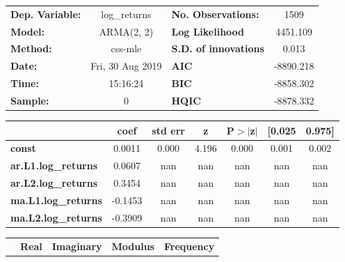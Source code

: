 \begin{center}
\begin{tabular}{lclc}
\toprule
\textbf{Dep. Variable:}     &        log\_returns       & \textbf{  No. Observations:  } &            1509            \\
\textbf{Model:}             &         ARMA(2, 2)        & \textbf{  Log Likelihood     } &          4451.109          \\
\textbf{Method:}            &          css-mle          & \textbf{  S.D. of innovations} &           0.013            \\
\textbf{Date:}              &      Fri, 30 Aug 2019     & \textbf{  AIC                } &         -8890.218          \\
\textbf{Time:}              &          15:16:24         & \textbf{  BIC                } &         -8858.302          \\
\textbf{Sample:}            &             0             & \textbf{  HQIC               } &         -8878.332          \\
\bottomrule
\end{tabular}
\begin{tabular}{lcccccc}
                            & \textbf{coef} & \textbf{std err} & \textbf{z} & \textbf{P$> |$z$|$} & \textbf{[0.025} & \textbf{0.975]}  \\
\midrule
\textbf{const}              &       0.0011  &        0.000     &     4.196  &         0.000        &        0.001    &        0.002     \\
\textbf{ar.L1.log\_returns} &       0.0607  &          nan     &       nan  &           nan        &          nan    &          nan     \\
\textbf{ar.L2.log\_returns} &       0.3454  &          nan     &       nan  &           nan        &          nan    &          nan     \\
\textbf{ma.L1.log\_returns} &      -0.1453  &          nan     &       nan  &           nan        &          nan    &          nan     \\
\textbf{ma.L2.log\_returns} &      -0.3909  &          nan     &       nan  &           nan        &          nan    &          nan     \\
\bottomrule
\end{tabular}
\begin{tabular}{lcccc}
              & \textbf{            Real} & \textbf{         Imaginary} & \textbf{         Modulus} & \textbf{        Frequency}  \\

\end{tabular}
\end{center}

